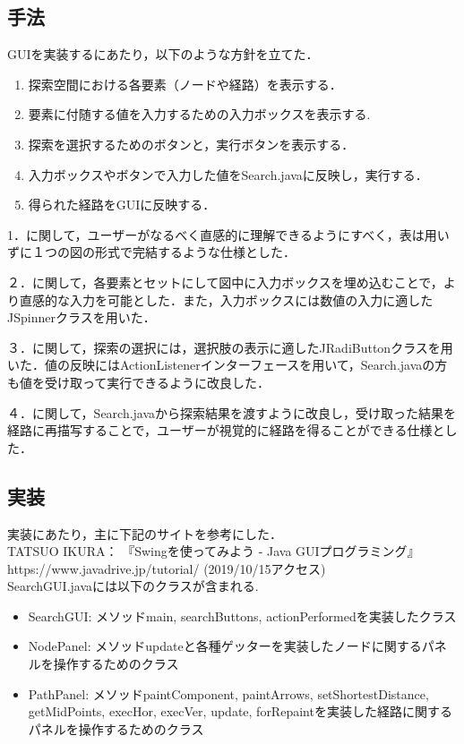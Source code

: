 \documentclass[12pt]{jarticle}
\begin{document}
\subsection{手法}
GUIを実装するにあたり，以下のような方針を立てた．
\begin{enumerate}
\item 探索空間における各要素（ノードや経路）を表示する．
\item 要素に付随する値を入力するための入力ボックスを表示する.
\item 探索を選択するためのボタンと，実行ボタンを表示する．
\item 入力ボックスやボタンで入力した値をSearch.javaに反映し，実行する．
\item 得られた経路をGUIに反映する．
\end{enumerate}

1．に関して，ユーザーがなるべく直感的に理解できるようにすべく，表は用いずに１つの図の形式で完結するような仕様とした．

２．に関して，各要素とセットにして図中に入力ボックスを埋め込むことで，より直感的な入力を可能とした．また，入力ボックスには数値の入力に適したJSpinnerクラスを用いた．

３．に関して，探索の選択には，選択肢の表示に適したJRadiButtonクラスを用いた．値の反映にはActionListenerインターフェースを用いて，Search.javaの方も値を受け取って実行できるように改良した．

４．に関して，Search.javaから探索結果を渡すように改良し，受け取った結果を経路に再描写することで，ユーザーが視覚的に経路を得ることができる仕様とした．

\clearpage

\subsection{実装}

実装にあたり，主に下記のサイトを参考にした． \\

TATSUO IKURA： 『Swingを使ってみよう - Java GUIプログラミング』 https://www.javadrive.jp/tutorial/ (2019/10/15アクセス) \\

SearchGUI.javaには以下のクラスが含まれる.
\begin{itemize}
\item SearchGUI: メソッドmain, searchButtons, actionPerformedを実装したクラス
\item NodePanel: メソッドupdateと各種ゲッターを実装したノードに関するパネルを操作するためのクラス
\item PathPanel: メソッドpaintComponent, paintArrows, setShortestDistance, getMidPoints, execHor, execVer, update, forRepaintを実装した経路に関するパネルを操作するためのクラス
\end{itemize}
\end{document}
